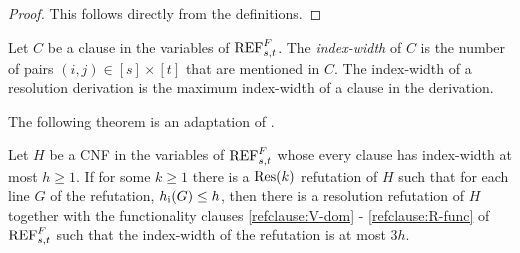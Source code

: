 \begin{proof}
This follows directly from the definitions.
\end{proof}


\begin{definition}
Let $C$ be a clause in the variables of $\textnormal{REF}^{F}_{s,t}$. The \emph{index-width} of $C$ is the number of  pairs $(i,j) \in [s] \times [t]$ that are mentioned in $C$. The index-width of a resolution derivation is the maximum index-width of a clause in the derivation.
\end{definition}

The following theorem is an adaptation of \cite[Theorem 5.1]{segerlind-buss-impagliazzo}. 

\begin{theorem}
\label{thm:shallow_trees_to_small_width_resolution}
Let $H$ be a CNF in the variables of $\textnormal{REF}^{F}_{s,t}$ whose every clause has index-width at most $h \geq 1$. If for some $k \geq 1$ there is a $\textnormal{Res}(k)$ refutation of $H$ such that for each line $G$ of the refutation, $h_{\textnormal{i}}(G) \leq h$, then there is a resolution refutation of $H$ together with the functionality clauses \eqref{refclause:V-dom} - \eqref{refclause:R-func} of $\textnormal{REF}^{F}_{s,t}$ such that the index-width of the refutation is at most $3h$.
\end{theorem}

